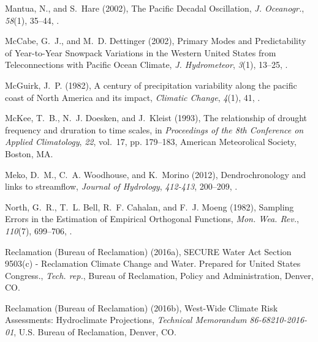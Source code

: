 \documentclass[final, double]{ua-thesis}
\begin{document}
\begin{thebibliography}{59}
Mantua, N., and S.~Hare (2002), The {Pacific} {Decadal} {Oscillation},
  \textit{J. Oceanogr.}, \textit{58}(1), 35--44, .

McCabe, G.~J., and M.~D. Dettinger (2002), Primary {Modes} and {Predictability}
  of {Year}-to-{Year} {Snowpack} {Variations} in the {Western} {United}
  {States} from {Teleconnections} with {Pacific} {Ocean} {Climate}, \textit{J.
  Hydrometeor}, \textit{3}(1), 13--25,
  .

McGuirk, J.~P. (1982), A century of precipitation variability along the pacific
  coast of {North} {America} and its impact, \textit{Climatic Change},
  \textit{4}(1), 41, .


McKee, T.~B., N.~J. Doesken, and J.~Kleist (1993), The relationship of drought
  frequency and druration to time scales, in \textit{Proceedings of the 8th
  {Conference} on {Applied} {Climatology}}, \textit{22}, vol.~17, pp. 179--183,
  American Meteorolical Society, Boston, MA.

Meko, D.~M., C.~A. Woodhouse, and K.~Morino (2012), Dendrochronology and links
  to streamflow, \textit{Journal of Hydrology}, \textit{412-413}, 200--209,
  .

North, G.~R., T.~L. Bell, R.~F. Cahalan, and F.~J. Moeng (1982), Sampling
  {Errors} in the {Estimation} of {Empirical} {Orthogonal} {Functions},
  \textit{Mon. Wea. Rev.}, \textit{110}(7), 699--706,
  .

{Reclamation (Bureau of Reclamation)} (2016a), {SECURE} {Water} {Act} {Section}
  9503(c) - {Reclamation} {Climate} {Change} and {Water}. {Prepared} for
  {United} {States} {Congress}., \textit{Tech. rep.}, Bureau of Reclamation,
  Policy and Administration, Denver, CO.

{Reclamation (Bureau of Reclamation)} (2016b), West-{Wide} {Climate} {Risk} {Assessments}:
  {Hydroclimate} {Projections}, \textit{Technical {Memorandum}
  86-68210-2016-01}, U.S. Bureau of Reclamation, Denver, CO.



\end{thebibliography}
\end{document}
